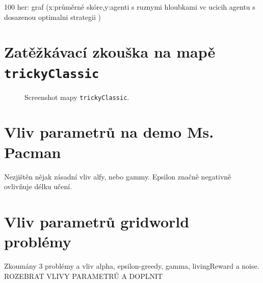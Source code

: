 100 her: graf (x:průměrné skóre,y:agenti s ruznymi hloubkami vc ucicih agentu s dosazenou optimalni strategii )

\section{Zatěžkávací zkouška na mapě \texttt{trickyClassic}}
\begin{figure}[!htbp]
\begin{center}
  \caption{Screenshot mapy \texttt{trickyClassic}.}
  \label{img:tricky}
\end{center}
\end{figure}

\section{Vliv parametrů na demo Ms. Pacman}
Nezjištěn nějak zásadní vliv alfy, nebo gammy. Epsilon značně negativně ovlivňuje délku učení.

\section{Vliv parametrů gridworld problémy}
Zkoumány 3 problémy a vliv alpha, epsilon-greedy, gamma, livingReward a noise. ROZEBRAT VLIVY PARAMETRŮ A DOPLNIT

\label{exper:grid}

